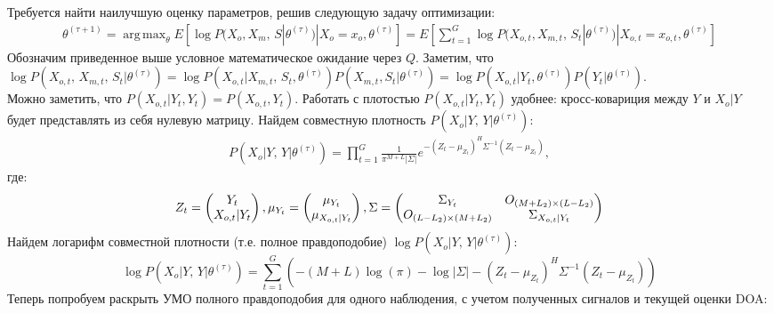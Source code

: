 \documentclass[11pt]{article}
\DeclareMathOperator*{\argmax}{arg\,max}
\begin{document}
\begin{center}
\fontsize{16}{20}\selectfont {}
\end{center}
Требуется найти наилучшую оценку параметров, решив следующую задачу оптимизации:
\begin{gather}
\theta^{(\tau+1)}=\argmax_{\theta} E[\log P(X_o, X_m, \, S|\theta^{(\tau)})|X_o=x_o, \theta^{(\tau)}] = E\left[\sum_{t=1}^G\log P(X_{o,t}, X_{m,t}, \, S_t|\theta^{(\tau)})|X_{o,t}=x_{o,t}, \theta^{(\tau)}\right]
\end{gather}
Обозначим приведенное выше условное математическое ожидание через $Q$. 
Заметим, что \\ $\log P(X_{o,t}, \, X_{m,t}, \, S_t|\theta^{(\tau)}) = \log P(X_{o,t}|X_{m,t}, \, S_t,\theta^{(\tau)})P(X_{m,t}, S_t|\theta^{(\tau)}) = \log P(X_{o,t}|Y_t,\theta^{(\tau)})P(Y_t|\theta^{(\tau)})$.\\
Можно заметить, что $P(X_{o,t}|Y_t, Y_t) = P(X_{o,t}, Y_t)$. Работать с плотостью $P(X_{o,t}|Y_t, Y_t)$ удобнее: кросс-ковариция между $Y$ и $X_o|Y$ будет представлять из себя нулевую матрицу.
Найдем совместную плотность $P(X_o|Y, \, Y|\theta^{(\tau)})$:
\begin{gather}
P(X_o|Y, \, Y|\theta^{(\tau)}) = \prod_{t=1}^G \frac{1}{\pi^{M+L}|\Sigma|}e^{-(Z_t-\mu_{Z_t})^H\Sigma^{-1}(Z_t-\mu_{Z_t})},
\end{gather}
где:
\begin{equation*}
Z_t = \begin{pmatrix}
Y_t\\
X_{o,t}|Y_t
\end{pmatrix},
\mu_{Y_t} = \begin{pmatrix}
\mu_{Y_t}\\
\mu_{X_{o,t}|Y_t}
\end{pmatrix}\\,
\Sigma = 
\begin{pmatrix}
\Sigma_{Y_t}&O_{(M+L_2)\times (L-L_2)}\\
O_{(L-L_2)\times (M+L_2)}&\Sigma_{X_{o,t}|Y_t}
\end{pmatrix}
\end{equation*}
Найдем логарифм совместной плотности (т.е. полное правдоподобие) $\log P(X_o|Y, \, Y|\theta^{(\tau)})$:
\begin{equation*}
\log P(X_o|Y, \, Y|\theta^{(\tau)}) = \sum_{t=1}^G \left(-(M+L)\log(\pi)-\log|\Sigma|-(Z_t-\mu_{Z_t})^H\Sigma^{-1}(Z_t-\mu_{Z_t})\right)
\end{equation*}
Теперь попробуем раскрыть УМО полного правдоподобия для одного наблюдения, с учетом полученных сигналов и текущей оценки DOA:
\end{document}
